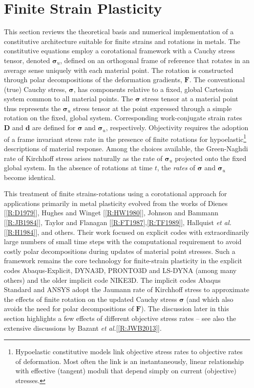 \documentclass[11pt]{report}
\numberwithin{equation}{section}
\newcommand{\ti}{\emph}
\newcommand{\etal}{\ti{et al.}\xspace}
\newcommand{\nid}{\noindent}
\newcommand{\cauchyu}{\boldsymbol{\sigma}_{u}}
\newcommand{\cauchy}{\boldsymbol{\sigma}}
\begin{document}
\section{Finite Strain Plasticity}
\nid 
This section reviews the theoretical basis and numerical implementation of a constitutive 
architecture suitable for finite strains and rotations in metals. 
The constitutive equations employ a corotational framework with a
Cauchy stress tensor, denoted $\cauchyu$, defined
on an orthogonal 
frame of reference that rotates in an average sense uniquely with each material point. The rotation is
constructed through polar decompositions
of the deformation gradients, $\mathbf{F}$. The conventional (true)
Cauchy stress, $\cauchy$, has components relative to a fixed, global Cartesian
system common to all material points.
The $\cauchy$ stress tensor at a material point  thus represents the  $\cauchyu$ stress tensor
at the point expressed through a simple rotation on the fixed, global system.
Corresponding work-conjugate strain rates $\mathbf{D}$ and $\mathbf{d}$
are defined for $\cauchy$ and $\cauchyu$, respectively. 
Objectivity requires the adoption of a frame invariant stress rate in the
presence of finite rotations for hypoelastic\footnote{Hypoelastic constitutive 
models link objective stress rates 
to objective rates of deformation. Most often the link is 
an instantaneously, linear relationship
with effective (tangent) moduli that depend simply on current (objective)
stresses.}  
descriptions of material
response. Among the choices available, the Green-Naghdi rate
of Kirchhoff stress arises naturally as the rate of $\cauchyu$ projected 
onto the fixed global system. In the
absence of rotations at time $t$, the \ti{rates} of $\cauchy$   and $\cauchyu$ become identical.

This treatment of finite strains-rotations using  a corotational approach
for applications primarily in metal plasticity
evolved from the works of Dienes [\ref{R:D1979}], Hughes and Winget [\ref{R:HW1980}],
Johnson and Bammann [\ref{R:JB1984}], Taylor and Flanagan 
[\ref{R:FT1987},\ref{R:TF1989}], 
Hallquist \etal [\ref{R:H1984}], and others. Their
work focused on explicit codes with extraordinarily large numbers of small time steps
with the computational requirement to avoid costly polar decompositions during
updates of material point stresses. Such a
framework  remains the core technology for 
finite-strain plasticity in the explicit codes Abaqus-Explicit, DYNA3D,  
PRONTO3D and LS-DYNA (among
many others) and the older implicit code NIKE3D. The implicit
codes Abaqus Standard and ANSYS adopt the Jaumann rate of
Kirchhoff stress to approximate the effects of finite rotation on the 
updated Cauchy stress $\cauchy$ (and which also avoids the need
for polar decompositions of $\mathbf{F}$).
The discussion later in this section highlights a few effects of different objective
stress rates -- see also the extensive discussions by Bazant \etal [\ref{R:JWB2013}].
\end{document}
